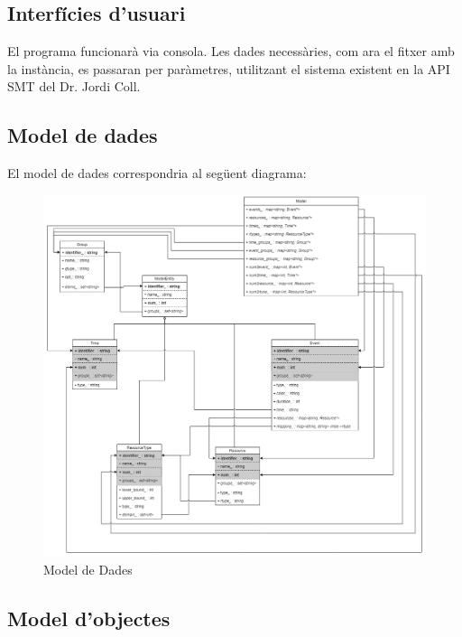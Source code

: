 \documentclass[11pt,a4paper,twoside]{report}
\begin{document}
  \subsection{Interfícies d'usuari}
  El programa funcionarà via consola. Les dades necessàries, com ara el fitxer amb la instància, es passaran per paràmetres, utilitzant el sistema existent en la API SMT del Dr. Jordi Coll.
  \subsection{Model de dades}

  El model de dades correspondria al següent diagrama:
  \begin{figure}[ht!]
    \includegraphics[width=\textwidth]{Diagrames/ModelDades.png}
    \caption{Model de Dades}
    \label{fig:DataModel}
  \end{figure}

  \subsection{Model d'objectes}
\end{document}
